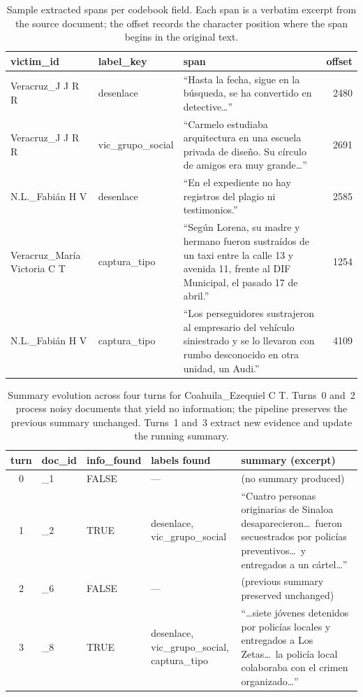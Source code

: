 \documentclass{article}
\begin{document}
\begin{table}[htbp]
    \centering
    \footnotesize
    \begin{tabular}{llp{7cm}r}
    \hline
    victim\_id & label\_key & span & offset \\
    \hline
    Veracruz\_J J R R & desenlace & ``Hasta la fecha, sigue en la b\'{u}squeda, se ha convertido en detective\dots'' & 2480 \\
    Veracruz\_J J R R & vic\_grupo\_social & ``Carmelo estudiaba arquitectura en una escuela privada de dise\~{n}o. Su c\'{i}rculo de amigos era muy grande\dots'' & 2691 \\
    N.L.\_Fabi\'{a}n H V & desenlace & ``En el expediente no hay registros del plagio ni testimonios.'' & 2585 \\
    Veracruz\_Mar\'{i}a Victoria C T & captura\_tipo & ``Seg\'{u}n Lorena, su madre y hermano fueron sustra\'{i}dos de un taxi entre la calle 13 y avenida 11, frente al DIF Municipal, el pasado 17 de abril.'' & 1254 \\
    N.L.\_Fabi\'{a}n H V & captura\_tipo & ``Los perseguidores sustrajeron al empresario del veh\'{i}culo siniestrado y se lo llevaron con rumbo desconocido en otra unidad, un Audi.'' & 4109 \\
    \hline
    \end{tabular}
    \caption{Sample extracted spans per codebook field. Each span is a verbatim excerpt from the source document; the offset records the character position where the span begins in the original text.}
    \label{tab:spans_example}
    \end{table}

\begin{table}[htbp]
    \centering
    \footnotesize
    \begin{tabular}{clllp{7.5cm}}
    \hline
    turn & doc\_id & info\_found & labels found & summary (excerpt) \\
    \hline
    0 & \_1 & FALSE & --- & (no summary produced) \\
    1 & \_2 & TRUE & desenlace, vic\_grupo\_social & ``Cuatro personas originarias de Sinaloa desaparecieron\dots\ fueron secuestrados por polic\'{i}as preventivos\dots\ y entregados a un c\'{a}rtel\dots'' \\
    2 & \_6 & FALSE & --- & (previous summary preserved unchanged) \\
    3 & \_8 & TRUE & desenlace, vic\_grupo\_social, captura\_tipo & ``\dots siete j\'{o}venes detenidos por polic\'{i}as locales y entregados a Los Zetas\dots\ la polic\'{i}a local colaboraba con el crimen organizado\dots'' \\
    \hline
    \end{tabular}
    \caption{Summary evolution across four turns for Coahuila\_Ezequiel C T. Turns~0 and~2 process noisy documents that yield no information; the pipeline preserves the previous summary unchanged. Turns~1 and~3 extract new evidence and update the running summary.}
    \label{tab:summary_turns_example}
    \end{table}
\end{document}

